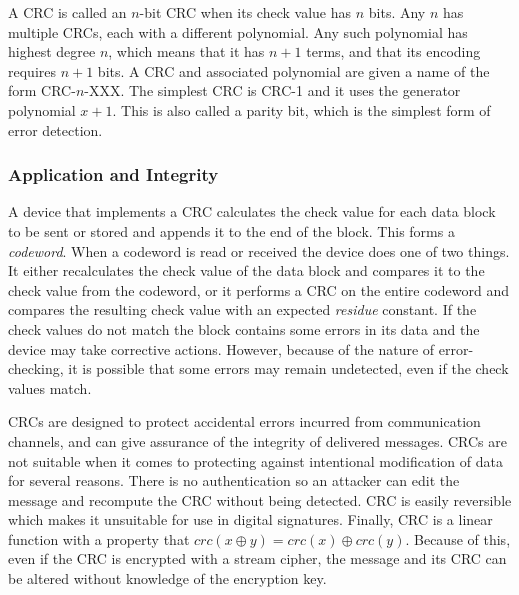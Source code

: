\documentclass{article}
\begin{document}
A CRC is called an $n$-bit CRC when its check value has $n$ bits. Any $n$ has multiple CRCs, each with a different polynomial. Any such polynomial has highest degree $n$, which means that it has $n + 1$ terms, and that its encoding requires $n + 1$ bits. A CRC and associated polynomial are given a name of the form CRC-$n$-XXX. The simplest CRC is CRC-1 and it uses the generator polynomial $x + 1$. This is also called a parity bit, which is the simplest form of error detection.

\subsubsection{Application and Integrity}
A device that implements a CRC calculates the check value for each data block to be sent or stored and appends it to the end of the block. This forms a \textit{codeword}. When a codeword is read or received the device does one of two things. It either recalculates the check value of the data block and compares it to the check value from the codeword, or it performs a CRC on the entire codeword and compares the resulting check value with an expected \textit{residue} constant. If the check values do not match the block contains some errors in its data and the device may take corrective actions. However, because of the nature of error-checking, it is possible that some errors may remain undetected, even if the check values match. 

CRCs are designed to protect accidental errors incurred from communication channels, and can give assurance of the integrity of delivered messages. CRCs are not suitable when it comes to protecting against intentional modification of data for several reasons. There is no authentication so an attacker can edit the message and recompute the CRC without being detected. CRC is easily reversible which makes it unsuitable for use in digital signatures. Finally, CRC is a linear function with a property that $crc(x \oplus y) = crc(x) \oplus crc(y)$. Because of this, even if the CRC is encrypted with a stream cipher, the message and its CRC can be altered without knowledge of the encryption key. 
\end{document}
